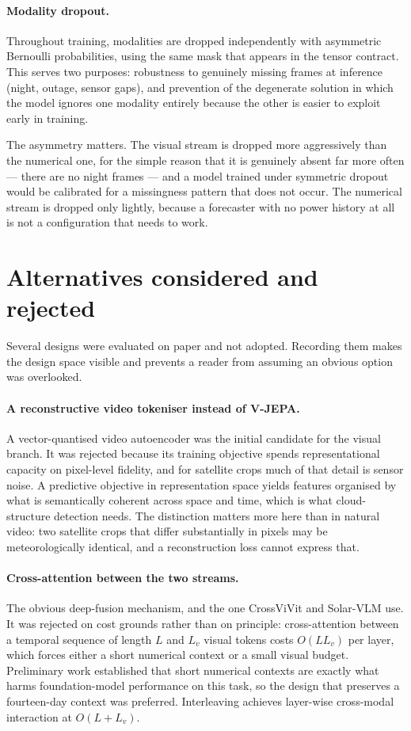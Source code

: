 \paragraph{Modality dropout.} Throughout training, modalities are dropped independently with
asymmetric Bernoulli probabilities, using the same mask that appears in the tensor contract.
This serves two purposes: robustness to genuinely missing frames at inference (night,
outage, sensor gaps), and prevention of the degenerate solution in which the model ignores one
modality entirely because the other is easier to exploit early in training.

The asymmetry matters. The visual stream is dropped more aggressively than the numerical one,
for the simple reason that it is genuinely absent far more often --- there are no night frames
--- and a model trained under symmetric dropout would be calibrated for a missingness pattern
that does not occur. The numerical stream is dropped only lightly, because a forecaster with
no power history at all is not a configuration that needs to work.

\section{Alternatives considered and rejected}
\label{sec:alternatives}

Several designs were evaluated on paper and not adopted. Recording them makes the design
space visible and prevents a reader from assuming an obvious option was overlooked.

\paragraph{A reconstructive video tokeniser instead of V-JEPA.} A vector-quantised video
autoencoder was the initial candidate for the visual branch. It was rejected because its
training objective spends representational capacity on pixel-level fidelity, and for
satellite crops much of that detail is sensor noise. A predictive objective in representation
space yields features organised by what is semantically coherent across space and time,
which is what cloud-structure detection needs. The distinction matters more here than in
natural video: two satellite crops that differ substantially in pixels may be
meteorologically identical, and a reconstruction loss cannot express that.

\paragraph{Cross-attention between the two streams.} The obvious deep-fusion mechanism, and
the one CrossViVit and Solar-VLM use. It was rejected on cost grounds rather than on
principle: cross-attention between a temporal sequence of length $L$ and $L_v$ visual tokens
costs $O(L L_v)$ per layer, which forces either a short numerical context or a small visual
budget. Preliminary work established that short numerical contexts are exactly what harms
foundation-model performance on this task, so the design that preserves a fourteen-day
context was preferred. Interleaving achieves layer-wise cross-modal interaction at
$O(L + L_v)$.

